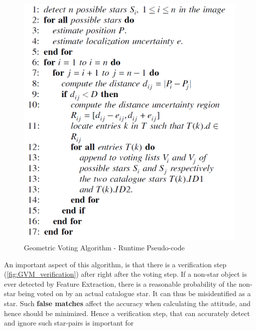 \documentclass[../../main.tex]{subfiles}
\begin{document}
\begin{figure}
    \centering
    \includegraphics[scale=0.6]{Figures/GNC/GVM_Runtime.PNG}
    \caption{Geometric Voting Algorithm - Runtime Pseudo-code}
    \label{fig:GVM_runtime}
\end{figure}


An important aspect of this algorithm, is that there is a verification step (\ref{fig:GVM_verification}) after right after the voting step. 
If a non-star object is ever detected by Feature Extraction, there is a reasonable probability of the non-star being voted on by an actual catalogue star. It can thus be misidentified as a star. Such \textbf{false matches} affect the accuracy when calculating the attitude, and hence should be minimized. Hence a verification step, that can accurately detect and ignore such star-pairs is important for 
\end{document}
